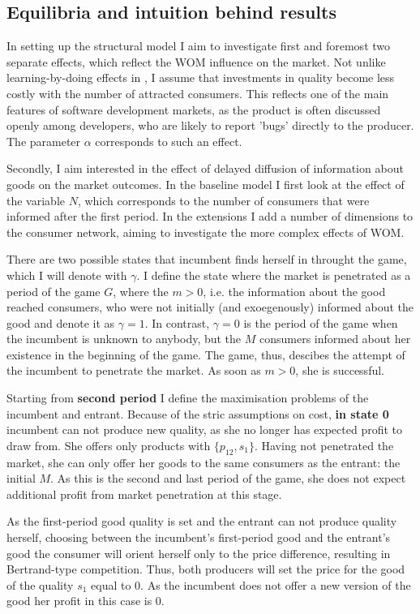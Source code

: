\documentclass{article}
\numberwithin{figure}{section}
\numberwithin{table}{section}
\theoremstyle{indented}
\numberwithin{equation}{section} %
\begin{document}
\subsection{Equilibria and intuition behind results} \label{results}

In setting up the structural model I aim to investigate first and foremost two separate effects, which reflect the WOM influence on the market. Not unlike learning-by-doing effects in \citet{Tirole}, I assume that investments in quality become less costly with the number of attracted consumers. This reflects one of the main features of software development markets, as the product is often discussed openly among developers, who are likely to report 'bugs' directly to the producer. The parameter $\alpha$ corresponds to such an effect. 
 
Secondly, I aim interested in the effect of delayed diffusion of information about goods on the market outcomes. In the baseline model I first look at the effect of the variable $N$, which corresponds to the number of consumers that were informed after the first period. In the extensions I add a number of dimensions to the consumer network, aiming to investigate the more complex effects of WOM. 

There are two possible states that incumbent finds herself in throught the game, which I will denote with $\gamma$. I define the state where the market is penetrated as a period of the game $G$, where the $m>0$, i.e. the information about the good reached consumers, who were not initially (and exoegenously) informed about the good and denote it as $\gamma=1$. In contrast, $\gamma=0$ is the period of the game when the incumbent is unknown to anybody, but the $M$ consumers informed about her existence in the beginning of the game. The game, thus, descibes the attempt of the incumbent to penetrate the market. As soon as $m>0$, she is successful. 

Starting from \textbf{second period} I define the maximisation problems of the incumbent and entrant. 
Because of the stric assumptions on cost, \textbf{in state 0} incumbent can not produce new quality, as she no longer has expected profit to draw from. She offers only products with $\{p_{12}, s_1\}$. Having not penetrated the market, she can only offer her goods to the same consumers as the entrant: the initial $M$. As this is the second and last period of the game, she does not expect additional profit from market penetration at this stage.

As the first-period good quality is set and the entrant can not produce quality herself, choosing between the incumbent's first-period good and the entrant's good the consumer will orient herself only to the price difference, resulting in Bertrand-type competition. Thus, both producers will set the price for the good of the quality $s_1$ equal to 0. As the incumbent does not offer a new version of the good her profit in this case is 0.
\end{document}
